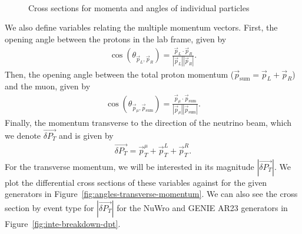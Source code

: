 \documentclass{article}
\newcommand{\vm}{\vec{p}_\mu}
\newcommand{\vlp}{\vec{p}_L}
\newcommand{\vrp}{\vec{p}_R}
\newcommand{\vtp}{\vec{p}_{\text{sum}}}
\newcommand{\vdp}{\vec{\delta P_T}}
\begin{document}
\begin{figure}
     \\
    \caption{Cross sections for momenta and angles of individual particles}
    \label{fig:momenta-cos-theta}
\end{figure}

We also define variables relating the multiple momentum vectors. First, the opening angle between the protons in the lab frame, given by 
\begin{align}
    \cos\left(\theta_{\vlp,\vrp}\right) = \frac{\vlp \cdot \vrp}{|\vlp||\vrp|}.
\end{align}
Then, the opening angle between the total proton momentum ($\vtp = \vlp + \vrp$) and the muon, given by 
\begin{align}
    \cos\left(\theta_{\vm,\vtp}\right) = \frac{\vm \cdot \vtp}{|\vm||\vtp|}.
\end{align}
Finally, the momentum transverse to the direction of the neutrino beam, which we denote $\vdp$ and is given by 
\begin{align}
    \vdp = \vec{p}^{\mu}_T + \vec{p}^{L}_T + \vec{p}^{R}_T.
\end{align}
For the transverse momentum, we will be interested in its magnitude $|\vdp|$. We plot the differential cross sections of these variables against for the given generators in Figure~\ref{fig:angles-transverse-momentum}. We can also see the cross section by event type for $|\vdp|$ for the NuWro and GENIE AR23 generators in Figure~\ref{fig:inte-breakdown-dpt}.
\end{document}
